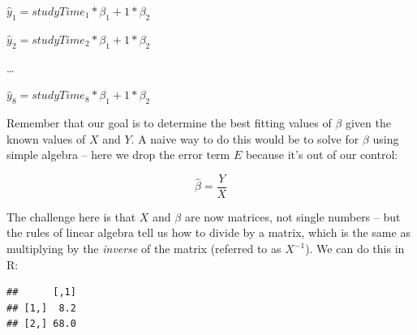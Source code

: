 \documentclass[12pt,]{book}
\newenvironment{Shaded}{\begin{snugshade}}{\end{snugshade}}
\newcommand{\CommentTok}[1]{\textcolor[rgb]{0.56,0.35,0.01}{\textit{#1}}}
\newcommand{\DataTypeTok}[1]{\textcolor[rgb]{0.13,0.29,0.53}{#1}}
\newcommand{\DecValTok}[1]{\textcolor[rgb]{0.00,0.00,0.81}{#1}}
\newcommand{\KeywordTok}[1]{\textcolor[rgb]{0.13,0.29,0.53}{\textbf{#1}}}
\newcommand{\NormalTok}[1]{#1}
\newcommand{\OperatorTok}[1]{\textcolor[rgb]{0.81,0.36,0.00}{\textbf{#1}}}
\newcommand{\StringTok}[1]{\textcolor[rgb]{0.31,0.60,0.02}{#1}}
\theoremstyle{definition}
\theoremstyle{definition}
\theoremstyle{definition}
\theoremstyle{remark}
\begin{document}
\(\hat{y}_1 = studyTime_1*\beta_1 + 1*\beta_2\)

\(\hat{y}_2 = studyTime_2*\beta_1 + 1*\beta_2\)

\ldots{}

\(\hat{y}_8 = studyTime_8*\beta_1 + 1*\beta_2\)

Remember that our goal is to determine the best fitting values of \(\beta\) given the known values of \(X\) and \(Y\). A naive way to do this would be to solve for \(\beta\) using simple algebra -- here we drop the error term \(E\) because it's out of our control:

\[
\hat{\beta} = \frac{Y}{X}
\]

The challenge here is that \(X\) and \(\beta\) are now matrices, not single numbers -- but the rules of linear algebra tell us how to divide by a matrix, which is the same as multiplying by the \emph{inverse} of the matrix (referred to as \(X^{-1}\)). We can do this in R:

\begin{Shaded}
\end{Shaded}

\begin{verbatim}
##      [,1]
## [1,]  8.2
## [2,] 68.0
\end{verbatim}
\end{document}
